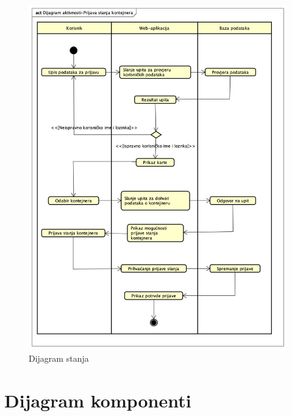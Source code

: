 			\begin{figure}[H]
				\includegraphics[scale=0.4]{figures/Dijagram aktivnosti-Prijava stanja kontejnera.PNG}
				\centering
				\caption{Dijagram stanja}
				\label{fig:Dijagram_aktivnosti}
			\end{figure} 
			
			
			\eject
		\section{Dijagram komponenti}
		
